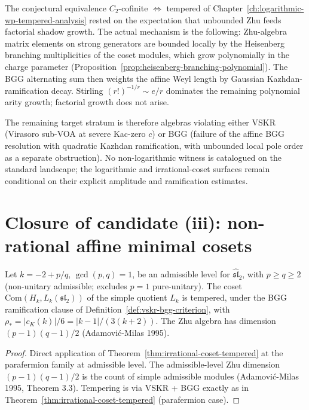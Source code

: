 \begin{remark}
\label{rem:heal-mode-refined-criterion}
The conjectural equivalence $C_2$-cofinite $\Leftrightarrow$ tempered
of Chapter~\ref{ch:logarithmic-wp-tempered-analysis} rested on the
expectation that unbounded Zhu feeds factorial shadow growth. The
actual mechanism is the following: Zhu-algebra matrix elements on
strong generators are bounded locally by the Heisenberg branching
multiplicities of the coset modules, which grow polynomially in the
charge parameter (Proposition~\ref{prop:heisenberg-branching-polynomial}).
The BGG alternating sum then weights the affine Weyl length by
Gaussian Kazhdan-ramification decay. Stirling
$(r!)^{-1/r} \sim e/r$ dominates the remaining polynomial arity
growth; factorial growth does not arise.

The remaining target stratum is therefore algebras violating either
VSKR (Virasoro sub-VOA at severe Kac-zero $c$) or BGG (failure of
the affine BGG resolution with quadratic Kazhdan ramification, with
unbounded local pole order as a separate obstruction). No
non-logarithmic witness is catalogued on the standard landscape; the
logarithmic and irrational-coset surfaces remain conditional on their
explicit amplitude and ramification estimates.
\end{remark}

\section{Closure of candidate (iii): non-rational affine minimal
cosets}
\label{sec:non-rational-affine-minimal}

\begin{corollary}
\label{cor:non-rational-affine-minimal-tempered}
\ClaimStatusConditional
Let $k = -2 + p/q$, $\gcd(p, q) = 1$, be an admissible level for
$\widehat{\mathfrak{sl}}_2$, with $p \ge q \ge 2$ (non-unitary
admissible; excludes $p = 1$ pure-unitary). The coset
$\mathrm{Com}(H_k, L_k(\mathfrak{sl}_2))$ of the simple quotient
$L_k$ is tempered, under the BGG ramification clause of
Definition~\ref{def:vskr-bgg-criterion}, with
$\rho_* = \lvert c_K(k) \rvert / 6 = \lvert k - 1 \rvert /
(3 (k + 2))$. The Zhu algebra has dimension $(p - 1)(q - 1) / 2$
(Adamović-Milas 1995).
\end{corollary}

\begin{proof}
Direct application of
Theorem~\ref{thm:irrational-coset-tempered} at the parafermion
family at admissible level. The admissible-level Zhu dimension
$(p - 1)(q - 1) / 2$ is the count of simple admissible modules
(Adamović-Milas 1995, Theorem 3.3). Tempering is via VSKR + BGG
exactly as in
Theorem~\ref{thm:irrational-coset-tempered} (parafermion case).
\end{proof}

